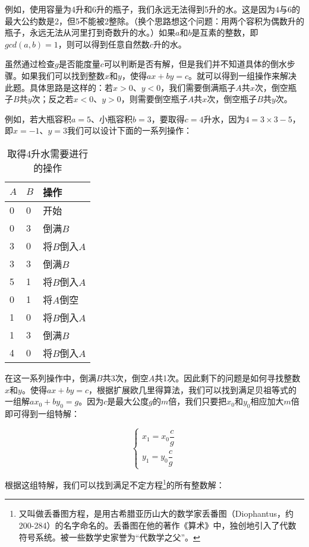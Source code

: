 \documentclass[UTF8]{article}
\begin{document}
例如，使用容量为4升和6升的瓶子，我们永远无法得到5升的水。这是因为4与6的最大公约数是2，但5不能被2整除。（换个思路想这个问题：用两个容积为偶数升的瓶子，永远无法从河里打到奇数升的水。）如果$a$和$b$是互素的整数，即$gcd(a, b) = 1$，则可以得到任意自然数$c$升的水。

虽然通过检查$g$是否能度量$c$可以判断是否有解，但是我们并不知道具体的倒水步骤。如果我们可以找到整数$x$和$y$，使得$ax + by = c$。就可以得到一组操作来解决此题。具体思路是这样的：若$x > 0$、$y < 0$，我们需要倒满瓶子$A$共$x$次，倒空瓶子$B$共$y$次；反之若$x < 0$、$y > 0$，则需要倒空瓶子$A$共$x$次，倒空瓶子$B$共$y$次。

例如，若大瓶容积$a=5$、小瓶容积$b=3$，要取得$c=4$升水，因为$4 = 3 \times 3 - 5$，即$x = -1$、$y = 3$我们可以设计下面的一系列操作：

\begin{table}[htbp]
\centering
\begin{tabular}{l|l|l}
$A$ & $B$ & 操作 \\
\hline
0 & 0 & 开始 \\
0 & 3 & 倒满$B$ \\
3 & 0 & 将$B$倒入$A$ \\
3 & 3 & 倒满$B$ \\
5 & 1 & 将$B$倒入$A$ \\
0 & 1 & 将$A$倒空 \\
1 & 0 & 将$B$倒入$A$ \\
1 & 3 & 倒满$B$ \\
4 & 0 & 将$B$倒入$A$ \\
\end{tabular}
\caption{取得4升水需要进行的操作} \label{tab:designed-jugs-ops}
\end{table}

在这一系列操作中，倒满$B$共3次，倒空$A$共1次。因此剩下的问题是如何寻找整数$x$和$y$。使得$ax + by = c$，根据扩展欧几里得算法，我们可以找到满足贝祖等式的一组解$ax_0 + by_0 = g$。因为$c$是最大公度$g$的$m$倍，我们只要把$x_0$和$y_0$相应加大$m$倍即可得到一组特解：

\[
\begin{cases}
  x_1 = x_0 \dfrac{c}{g} \\[2ex]
  y_1 = y_0 \dfrac{c}{g}
\end{cases}
\]

根据这组特解，我们可以找到满足不定方程\footnote{又叫做丢番图方程，是用古希腊亚历山大的数学家丢番图（Diophantus，约200-284）的名字命名的。丢番图在他的著作《算术》中，独创地引入了代数符号系统。被一些数学史家誉为“代数学之父”\cite{HanXueTao2009}。}的所有整数解：
\end{document}
